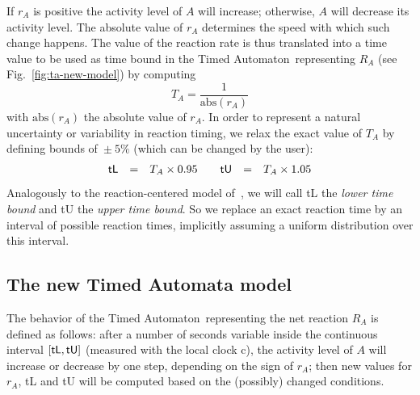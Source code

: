 \documentclass{llncs}
\newcommand{\ta}{Timed Automaton}
\begin{document}
If $r_A$ is positive the activity level of $A$ will increase;
otherwise, $A$ will decrease its activity level.
The absolute value of $r_A$ determines the speed with which such change happens.
The value of the reaction rate is thus translated into a time value to be used as
time bound in the \ta\ representing $R_A$ (see Fig.~\ref{fig:ta-new-model}) by computing
$$T_A = \frac{1}{\mbox{abs}(r_A)}$$
with $\mbox{abs}(r_A)$ the absolute value of $r_A$. In order to represent
a natural uncertainty or variability in reaction timing, we relax the exact value of $T_A$ by
defining bounds of~$\pm~5\%$ (which can be changed by the user):
$$
\begin{array}{lcllcl}
  \mbox{\sf tL} &=& T_A \times 0.95 \qquad
  \mbox{\sf tU} &=& T_A \times 1.05
\end{array}
$$
Analogously to the reaction-centered model of~\cite{animo-ieee},
we will call {\sf tL} the \emph{lower time bound} and {\sf tU} the \emph{upper time bound}.
So we replace an exact reaction time by an interval of possible reaction times,
implicitly assuming a uniform distribution over this interval.



\subsection{The new Timed Automata model}\label{sec:ta-model}
The behavior of the \ta\ representing the net reaction $R_A$ is defined as follows: after a number of seconds
variable inside the continuous interval $[\mbox{\sf tL}, \mbox{\sf tU}]$ (measured with the local clock {\sf c}),
the activity level of $A$ will increase or
decrease by one step, depending on the sign of $r_A$; then new values for $r_A$, {\sf tL} and {\sf tU} will be computed based
on the (possibly) changed conditions.
\end{document}
